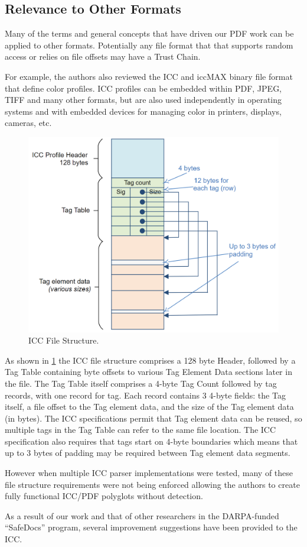 \subsection{Relevance to Other Formats}
\label{sec:other-formats}

Many of the terms and general concepts that have driven our PDF work
can be applied to other formats. Potentially any file format that that supports random access or relies on file offsets may have a Trust Chain.

For example, the authors also reviewed the ICC \cite{isotc130jwg7ISO15076120102010} and 
iccMAX \cite{iccSpecificationICC20192019} binary file format that define color profiles.
ICC profiles can be embedded within PDF, JPEG, TIFF and many other formats, but are also 
used independently in operating systems and with embedded devices for managing color in 
printers, displays, cameras, etc.

\begin{figure}[t]
    \centering
    \includegraphics[width=0.85\linewidth]{figures/icc.png}
    \caption{ICC File Structure.}
    \label{fig:icc-structure}
\end{figure}

As shown in \cref{fig:icc-structure} the ICC file structure comprises a 128 byte Header, followed by a 
Tag Table containing byte offsets to various Tag Element Data sections later in the file. 
The Tag Table itself comprises a 4-byte Tag Count followed by tag records, with one record for tag. 
Each record contains 3 4-byte fields: the Tag itself, a file offset to the Tag element data, and the size of the Tag element data (in bytes).
The ICC specifications permit that Tag element data can be reused, so multiple tags in the Tag Table can
refer to the same file location. The ICC specification also requires that tags start on 4-byte boundaries
which means that up to 3 bytes of padding may be required between Tag element data segments.

However when multiple ICC parser implementations were tested, many of these file structure requirements
were not being enforced allowing the authors to create fully functional ICC/PDF polyglots 
without detection.

As a result of our work and that of other researchers in the DARPA-funded ``SafeDocs'' program, several
improvement suggestions have been provided to the ICC.
